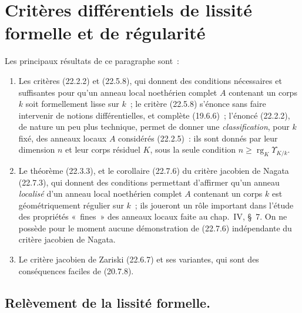 \section{Critères différentiels de lissité formelle et de régularité}
\label{section:0.22-fr}

Les principaux résultats de ce paragraphe sont~:
\begin{enumerate}
  \item[\textit{a)}] Les critères (22.2.2) et (22.5.8), qui donnent des conditions
  nécessaires et suffisantes pour qu'un anneau local noethérien complet $A$
  contenant un corps $k$ soit formellement lisse sur $k$~; le critère
  (22.5.8) s'énonce sans faire intervenir de notions différentielles, et
  complète (19.6.6)~; l'énoncé (22.2.2), de nature un peu plus technique,
  permet de donner une \emph{classification}, pour $k$ fixé, des anneaux
  locaux $A$ considérés (22.2.5)~: ils sont donnés par leur dimension $n$ et
  leur corps résiduel $K$, sous la seule condition
  $n\geqslant\operatorname{rg}_K\Upsilon_{K/k}$.

  \item[\textit{b)}] Le théorème (22.3.3), et le corollaire (22.7.6) du critère
  jacobien de Nagata (22.7.3), qui donnent des conditions permettant
  d'affirmer qu'un anneau \emph{localisé} d'un anneau local noethérien complet
  $A$ contenant un corps $k$ est géométriquement régulier sur $k$~; ils
  joueront un rôle important dans l'étude des propriétés «~fines~» des
  anneaux locaux faite au chap.~IV, §~7. On ne possède pour le moment aucune
  démonstration de (22.7.6) indépendante du critère jacobien de Nagata.

  \item[\textit{c)}] Le critère jacobien de Zariski (22.6.7) et ses variantes, qui
  sont des conséquences faciles de (20.7.8).
\end{enumerate}

\subsection{Relèvement de la lissité formelle.}
\label{subsection:0.22.1-fr}

